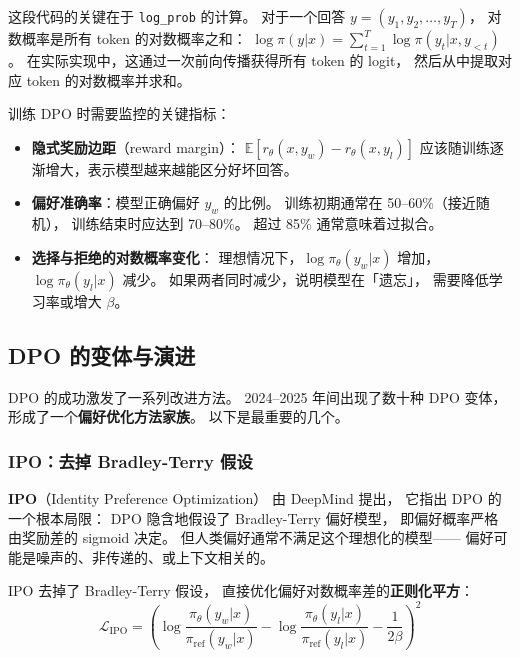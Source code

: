 这段代码的关键在于 \texttt{log\_prob} 的计算。
对于一个回答 $y = (y_1, y_2, \ldots, y_T)$，
对数概率是所有 token 的对数概率之和：
$\log \pi(y|x) = \sum_{t=1}^T \log \pi(y_t | x, y_{<t})$。
在实际实现中，这通过一次前向传播获得所有 token 的 logit，
然后从中提取对应 token 的对数概率并求和。

训练 DPO 时需要监控的关键指标：
\begin{itemize}[noitemsep]
  \item \textbf{隐式奖励边距}（reward margin）：
        $\mathbb{E}[r_\theta(x, y_w) - r_\theta(x, y_l)]$
        应该随训练逐渐增大，表示模型越来越能区分好坏回答。
  \item \textbf{偏好准确率}：模型正确偏好 $y_w$ 的比例。
        训练初期通常在 50--60\%（接近随机），
        训练结束时应达到 70--80\%。
        超过 85\% 通常意味着过拟合。
  \item \textbf{选择与拒绝的对数概率变化}：
        理想情况下，$\log \pi_\theta(y_w|x)$ 增加，
        $\log \pi_\theta(y_l|x)$ 减少。
        如果两者同时减少，说明模型在「遗忘」，
        需要降低学习率或增大 $\beta$。
\end{itemize}

\subsection{DPO 的变体与演进}

DPO 的成功激发了一系列改进方法。
2024--2025 年间出现了数十种 DPO 变体，
形成了一个\textbf{偏好优化方法家族}。
以下是最重要的几个。

\subsubsection{IPO：去掉 Bradley-Terry 假设}


\textbf{IPO}（Identity Preference Optimization）
由 DeepMind 提出，
它指出 DPO 的一个根本局限：
DPO 隐含地假设了 Bradley-Terry 偏好模型，
即偏好概率严格由奖励差的 sigmoid 决定。
但人类偏好通常不满足这个理想化的模型——
偏好可能是噪声的、非传递的、或上下文相关的。

IPO 去掉了 Bradley-Terry 假设，
直接优化偏好对数概率差的\textbf{正则化平方}：
\begin{equation}
  \mathcal{L}_{\text{IPO}} = \left(
    \log \frac{\pi_\theta(y_w|x)}{\pi_{\text{ref}}(y_w|x)}
    - \log \frac{\pi_\theta(y_l|x)}{\pi_{\text{ref}}(y_l|x)}
    - \frac{1}{2\beta}
  \right)^2
  \label{eq:ipo}
\end{equation}

